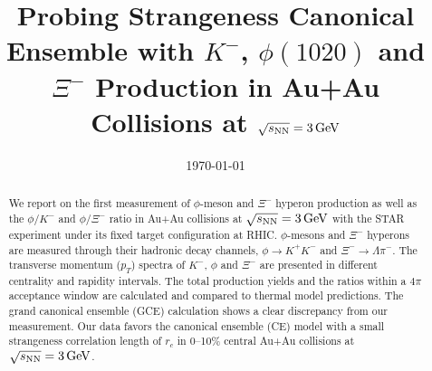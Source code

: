 \documentclass[%
 reprint,	
showpacs,
 amsmath,amssymb,
 aps,
 prc,
]{revtex4-1}
\begin{document}

\title{Probing Strangeness Canonical Ensemble with $K^{-}$, $\phi(1020)$ and $\Xi^{-}$ Production in Au+Au Collisions at ${\sqrt{s_{\rm NN}} = \rm{3\,GeV}}$}%


\noaffiliation

\date{\today}%

\begin{abstract}


We report on the first measurement of $\phi$-meson and $\Xi^{-}$ hyperon production as well as the $\phi/K^-$ and $\phi/\Xi^-$ ratio in Au+Au collisions at ${\sqrt{s_{\rm NN}} = \rm{3\,GeV}}$ with the STAR experiment under its fixed target configuration at RHIC. $\phi$-mesons and $\Xi^{-}$ hyperons are measured through their hadronic decay channels, $\phi\rightarrow K^+K^-$ and $\Xi^-\rightarrow \Lambda\pi^-$. The transverse momentum ($p_T$) spectra of $K^-$, $\phi$ and $\Xi^{-}$ are presented in different centrality and rapidity intervals. The total production yields and the ratios within a $4\pi$ acceptance window are calculated and compared to thermal model predictions. The grand canonical ensemble (GCE) calculation shows a clear discrepancy from our measurement. Our data favors the canonical ensemble (CE) model with a small strangeness correlation length of $r_c$ in 0--10\% central Au+Au collisions at ${\sqrt{s_{\rm NN}} = \rm{3\,GeV}}$.


\end{abstract}
\end{document}
